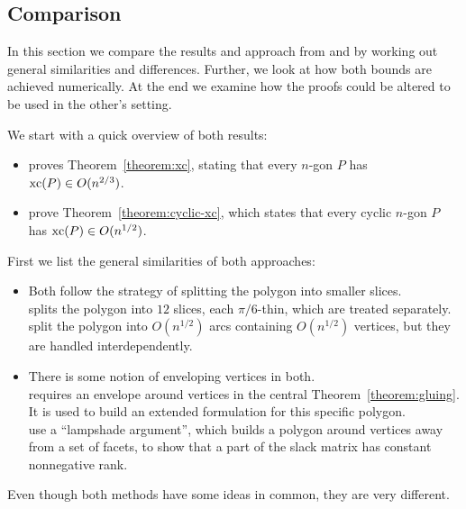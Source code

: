 \subsection{Comparison}

In this section we compare the results and approach from \textcite{shitov2020sublinear} and \textcite{kwan2020extension} by working out general similarities and differences. Further, we look at how both bounds are achieved numerically. At the end we examine how the proofs could be altered to be used in the other's setting.

We start with a quick overview of both results:

\begin{itemize}
  \item \textcite{shitov2020sublinear} proves Theorem~\ref{theorem:xc}, stating that every $n$-gon $P$ has $\operatorname{xc}(P) \in O(n^{2/3})$.
  \item \textcite{kwan2020extension} prove Theorem~\ref{theorem:cyclic-xc}, which states that every cyclic $n$-gon $P$ has $\operatorname{xc}(P) \in O(n^{1/2})$.
\end{itemize}

First we list the general similarities of both approaches:

\begin{itemize}
  \item Both follow the strategy of splitting the polygon into smaller slices.\\
        \textcite{shitov2020sublinear} splits the polygon into $12$ slices, each $\pi/6$-thin, which are treated separately.\\
        \textcite{kwan2020extension} split the polygon into $O(n^{1/2})$ arcs containing $O(n^{1/2})$ vertices, but they are handled interdependently.
  \item There is some notion of enveloping vertices in both.\\
        \textcite{shitov2020sublinear} requires an envelope around vertices in the central Theorem~\ref{theorem:gluing}. It is used to build an extended formulation for this specific polygon.\\
        \textcite{kwan2020extension} use a ``lampshade argument'', which builds a polygon around vertices away from a set of facets, to show that a part of the slack matrix has constant nonnegative rank.
\end{itemize}

Even though both methods have some ideas in common, they are very different.

